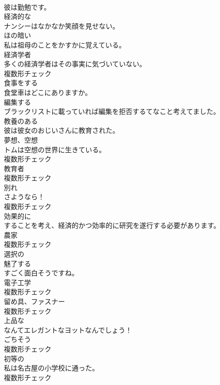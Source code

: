 \documentclass[8pt]{extreport}
\begin{document}
\begin{CJK}{UTF8}{min}
\\	彼は勤勉です。	
\\	[形容詞]	経済的な	
\\	ナンシーはなかなか笑顔を見せない。	
\\	[形容詞]	ほの暗い	
\\	私は祖母のことをかすかに覚えている。	
\\	[名詞]	経済学者	
\\	多くの経済学者はその事実に気づいていない。	
\\	複数形チェック
\\	[動詞]	食事をする	
\\	食堂車はどこにありますか。	
\\	[動詞]	編集する	
\\	ブラックリストに載っていれば編集を拒否するてなこと考えてました。	
\\	[形容詞]	教養のある	
\\	彼は彼女のおじいさんに教育された。	
\\	[名詞]	夢想、空想	
\\	トムは空想の世界に生きている。	
\\	複数形チェック
\\	[名詞]	教育者	
\\	複数形チェック
\\	[名詞]	別れ	
\\	さようなら！	
\\	複数形チェック
\\	[副詞]	効果的に	
\\	することを考え、経済的かつ効率的に研究を遂行する必要があります。	
\\	[名詞]	農家	
\\	複数形チェック
\\	[形容詞]	選択の	
\\	[形容詞]	魅了する	
\\	すごく面白そうですね。	
\\	[名詞]	電子工学	
\\	複数形チェック
\\	[名詞]	留め具、ファスナー	
\\	複数形チェック
\\	[形容詞]	上品な	
\\	なんてエレガントなヨットなんでしょう！	
\\	[名詞]	ごちそう	
\\	複数形チェック
\\	[名詞]	初等の	
\\	私は名古屋の小学校に通った。	
\\	複数形チェック

\end{CJK}
\end{document}
